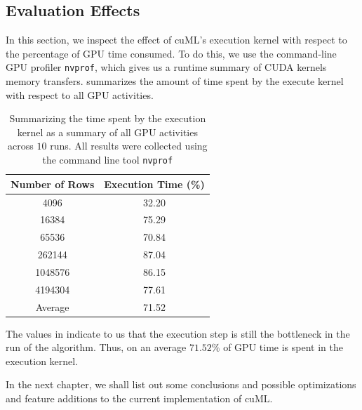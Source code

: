 \subsection{Evaluation Effects}
\label{sec:evaleffects}
In this section, we inspect the effect of cuML's execution kernel with respect to the percentage of GPU time consumed. To do this, we use the command-line GPU profiler \lstinline!nvprof!, which gives us a runtime summary of CUDA kernels memory transfers.  summarizes the amount of time spent by the execute kernel with respect to all GPU activities. 

\begin{table}[htbp]
  \caption{Summarizing the time spent by the execution kernel as a summary of all GPU activities across $10$ runs. All results were collected using the command line tool \lstinline!nvprof!}
  \begin{center}
    \begin{tabular}[c]{cc}
      \toprule
      \textbf{Number of Rows} & \textbf{Execution Time (\%)} \\
      \midrule
      4096    & 32.20\\
      16384   & 75.29\\
      65536   & 70.84\\
      262144  & 87.04\\ 
      1048576 & 86.15\\
      4194304 & 77.61\\
      \midrule
      Average & 71.52\\
      \bottomrule
    \end{tabular}
    \label{tab:nvprofexec}
  \end{center}
\end{table}


The values in  indicate to us that the execution step is still the bottleneck in the run of the algorithm. Thus, on an average $71.52\%$ of GPU time is spent in the execution kernel.

\pagebreak
In the next chapter, we shall list out some conclusions and possible optimizations and feature additions to the current implementation of cuML. 
